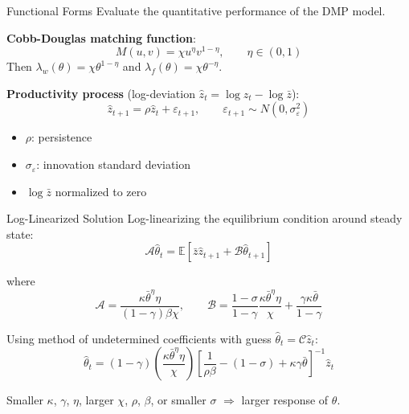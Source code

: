 \documentclass[blue]{beamer}
\newcommand{\E}{\mathbb{E}}
\begin{document}
\begin{frame}{Functional Forms}
	Evaluate the quantitative performance of the DMP model.
	
	\bigskip
	\textbf{Cobb-Douglas matching function}:
	\[
	M(u, v) = \chi u^\eta v^{1-\eta}, \qquad \eta \in (0, 1)
	\]
	Then $\lambda_w(\theta) = \chi \theta^{1-\eta}$ and $\lambda_f(\theta) = \chi \theta^{-\eta}$.
	
	\bigskip
	\textbf{Productivity process} (log-deviation $\hat{z}_t = \log z_t - \log \bar{z}$):
	\[
	\hat{z}_{t+1} = \rho \hat{z}_t + \varepsilon_{t+1}, \qquad \varepsilon_{t+1} \sim N(0, \sigma_\varepsilon^2)
	\]
	
	\begin{itemize}
		\item $\rho$: persistence
		\item $\sigma_\varepsilon$: innovation standard deviation
		\item $\log \bar{z}$ normalized to zero
	\end{itemize}
\end{frame}

\begin{frame}{Log-Linearized Solution}
	Log-linearizing the equilibrium condition around steady state:
	\[
	\mathcal{A}\hat\theta_t = \E[\bar{z} \hat{z}_{t+1} + \mathcal{B} \hat\theta_{t+1}]
	\]
	
	\bigskip
	where
	\[
	\mathcal{A} = \frac{\kappa \bar\theta^\eta \eta}{(1 - \gamma) \beta \chi}, \qquad \mathcal{B}= \frac{1 - \sigma}{1 - \gamma} \frac{\kappa \bar\theta^\eta \eta}{\chi} + \frac{\gamma \kappa \bar\theta}{1 - \gamma}
	\]
	
	\bigskip
	Using method of undetermined coefficients with guess $\hat\theta_t = \mathcal{C} \hat{z}_t$:
	\[
	{\hat\theta_t = (1 - \gamma) \left(\frac{\kappa \bar\theta^\eta \eta}{\chi}\right) \! \left[\frac{1}{\rho \beta} - (1 - \sigma) + \kappa \gamma \bar\theta \right]^{-1} \!\hat{z}_t}
	\]
	
	\bigskip
	Smaller $\kappa$, $\gamma$, $\eta$, larger $\chi$, $\rho$, $\beta$, or smaller $\sigma$ $\Rightarrow$ larger response of $\theta$.
\end{frame}
\end{document}
